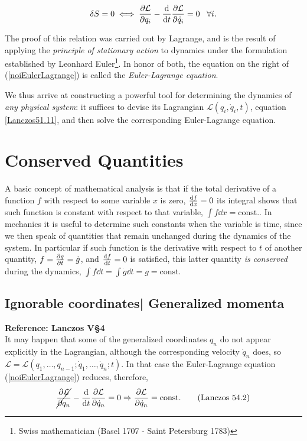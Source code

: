 \documentclass[12pt, english, a4paper]{article}
\begin{document}
\begin{equation}
	\delta S=0 \iff \pdv{\mathcal{L}}{q_i} - \dv{t} \pdv{\mathcal{L}}{\dot{q}_i}= 0 \; \; \; \forall i.
    \label{noiEulerLagrange}
\end{equation}

The proof of this relation was carried out by Lagrange, and is the result of applying the \emph{principle of stationary action} to dynamics under the formulation established by Leonhard Euler\footnote{Swiss mathematician (Basel 1707 - Saint Petersburg 1783)}.
In honor of both, the equation on the right of (\ref{noiEulerLagrange}) is called the \emph{Euler-Lagrange equation}.

We thus arrive at constructing a powerful tool for determining the dynamics of \emph{any physical system}:
it suffices to devise its Lagrangian \(\mathcal{L}(q_i, \dot{q}_i, t)\), equation \eqref{Lanczos51.11}, and then solve the corresponding Euler-Lagrange equation.

\section{Conserved Quantities}
A basic concept of mathematical analysis is that if the total derivative of a function \(f\) with respect to some variable \(x\) is zero, \(\dv{f}{x}=0\) its integral shows that such function is constant with respect to that variable, \(\int f \dd x= \mathrm{const.}\).
In mechanics it is useful to determine such constants when the variable is time, since we then speak of quantities that remain unchanged during the dynamics of the system.
In particular if such function is the derivative with respect to \(t\) of another quantity, \(f= \pdv{g}{t}= \dot{g}\), and \(\dv{f}{t}=0\) is satisfied, this latter quantity \emph{is conserved} during the dynamics, \(\int f \dd t= \int \dot{g} \dd t= g= \mathrm{const.}\)


\subsection{Ignorable coordinates| Generalized momenta} %

\textbf{Reference: Lanczos V\S4}\\

It may happen that some of the generalized coordinates \(q_n\) do not appear explicitly in the Lagrangian, although the corresponding velocity \(\dot{q}_n\) does, so \(\mathcal{L} = \mathcal{L}(q_1,\ldots,q_{n - 1};\dot{q}_1,\ldots,\dot{q}_n;t)\).
In that case the Euler-Lagrange equation (\ref{noiEulerLagrange}) reduces, therefore,
\begin{equation}\label{unsereLanczos54.2}
    \cancel{\pdv{\mathcal{L}}{q_n}} - \dv{t} \pdv{\mathcal{L}}{\dot{q}_n}= 0 \Rightarrow \pdv{\mathcal{L}}{\dot{q}_n}= \mathrm{const.}
    \tag{Lanczos 54.2}
\end{equation}
\end{document}
